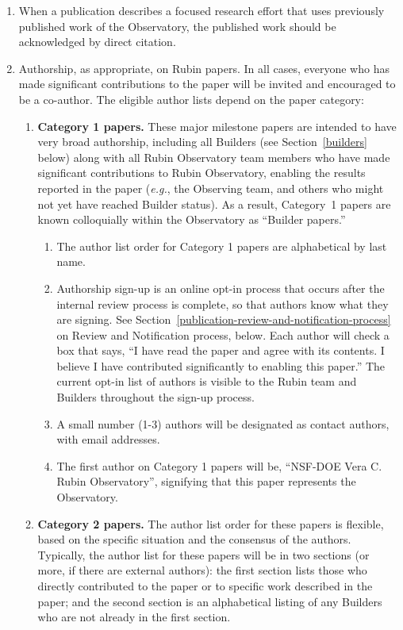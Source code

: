 \begin{enumerate}
\def\labelenumi{\arabic{enumi}.}
\item
  When a publication describes a focused research effort that uses previously published work of the Observatory, the published work should be acknowledged by direct citation.
\item
  Authorship, as appropriate, on Rubin papers.
  In all cases, everyone who has made significant contributions to the paper will be invited and encouraged to be a co-author.
  The eligible author lists depend on the paper category:

  \begin{enumerate}
  \def\labelenumii{\alph{enumii}.}
  \item
    \textbf{Category 1 papers.} These major milestone papers are intended to have very broad authorship, including all Builders (see Section~\ref{builders} below) along with all Rubin Observatory team members who have made significant contributions to Rubin Observatory, enabling the results reported in the paper (\emph{e.g.}, the Observing team, and others who might not yet have reached Builder status). As a result, Category~1 papers are known colloquially within the Observatory as ``Builder papers.''

    \begin{enumerate}
    \def\labelenumiii{\roman{enumiii}.}
    \item
      The author list order for Category 1 papers are alphabetical by last name.
    \item
      Authorship sign-up is an online opt-in process that occurs after the internal review process is complete, so that authors know what they are signing.
      See Section~\ref{publication-review-and-notification-process} on Review and Notification process, below.
      Each author will check a box that says, ``I have read the paper and agree with its contents.
      I believe I have contributed significantly to enabling this paper.''
      The current opt-in list of authors is visible to the Rubin team and Builders throughout the sign-up process.
    \item
      A small number (1-3) authors will be designated as contact authors, with email addresses.
    \item
      The first author on Category 1 papers will be, ``NSF-DOE Vera C. Rubin Observatory'', signifying that this paper represents the Observatory.
    \end{enumerate}
  \item
    \textbf{Category 2 papers.} The author list order for these papers is flexible, based on the specific situation and the consensus of the authors.
    Typically, the author list for these papers will be in two sections (or more, if there are external authors): the first section lists those who directly contributed to the paper or to specific work described in the paper; and the second section is an alphabetical listing of any Builders who are not already in the first section.


\end{enumerate}
\end{enumerate}
